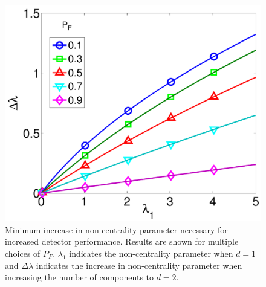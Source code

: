 \begin{figure}[t]
\centering
\includegraphics[width=\figwidth]{taes_msd/figures/nc_lines.pdf}
\caption{Minimum increase in non-centrality parameter necessary for increased detector
  performance. Results are shown for multiple choices of $P_F$. $\lambda_1$ indicates the
  non-centrality parameter when $d=1$ and $\Delta\lambda$ indicates the increase in
  non-centrality parameter when increasing the number of components to $d=2$.}
\label{fig:nc_lines}
\end{figure}
